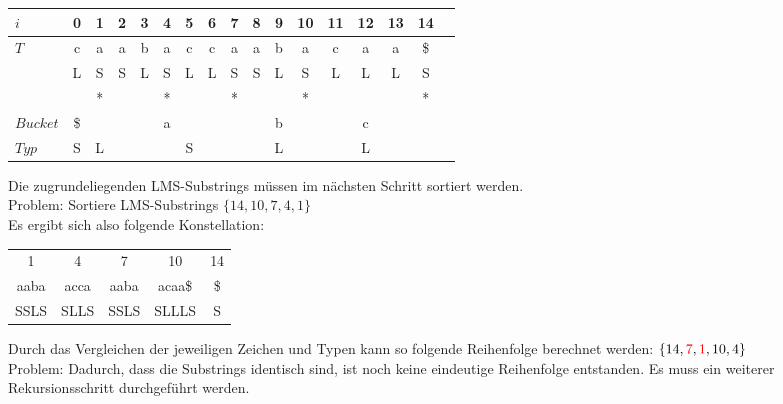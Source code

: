 \begin{center}
  \begin{tabular}{ | l | c | c | c | c | c | c | c | c | c | c | c | c | c | c | c | c | }
    \hline
        $i$ & 0 & 1 & 2 & 3 & 4 & 5 & 6 & 7 & 8 & 9 & 10 & 11 & 12 & 13 & 14 \\ \hline
        $T$ & c & a & a & b & a & c & c & a & a & b & a & c & a & a & \$ \\ \hline
            & L & S & S & L & S & L & L & S & S & L & S & L & L & L & S \\ \hline
            &   & * &   &   & * &   &   & * &   &   & * &   &   &   & * \\ \hline
   $Bucket$ &\$ & \multicolumn{7}{c}{a} &   & \multicolumn{1}{c}{b} &   & \multicolumn{3}{c}{c} & \\ \hline
      $Typ$ & S & \multicolumn{1}{c}{L} &   & \multicolumn{5}{c}{S} &   & \multicolumn{1}{c}{L} &    & \multicolumn{3}{c}{L} &\\
    \hline
  \end{tabular}
\end{center}
\bigskip

\noindent Die zugrundeliegenden LMS-Substrings müssen im nächsten Schritt sortiert werden. \\
\noindent Problem: Sortiere LMS-Substrings $\{14, 10, 7, 4, 1\}$ \\

\noindent Es ergibt sich also folgende Konstellation:

\begin{center}
	\begin{tabular}{c|c|c|c|c}
			 1 	     &            4          &          7            &           10            &          14 \\
          	aaba     &          acca         &        aaba           &          acaa\$         &          \$  \\
         	SSLS     &          SLLS         &        SSLS           &          SLLLS          &           S
	\end{tabular}
\end{center}
\bigskip

\noindent Durch das Vergleichen der jeweiligen Zeichen und Typen kann so folgende Reihenfolge berechnet werden: $\{14, \textcolor{red}{7}, \textcolor{red}{1}, 10, 4\}$ \\
\noindent Problem: Dadurch, dass die Substrings identisch sind, ist noch keine eindeutige Reihenfolge entstanden. Es muss ein weiterer Rekursionsschritt durchgeführt werden.

